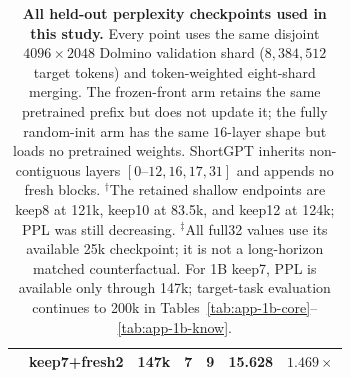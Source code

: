 \begin{table}[t]
{\begin{tabular}{@{}llrrrrr@{}}
& keep7+fresh2 & 147k & 7 & 9 & 15.628 & $1.469\times$ \\
\bottomrule
\end{tabular}%
}
\caption{\textbf{All held-out perplexity checkpoints used in this study.}
Every point uses the same disjoint $4096\times2048$ Dolmino validation shard
($8{,}384{,}512$ target tokens) and token-weighted eight-shard merging. The
frozen-front arm retains the same pretrained prefix but does not update it; the
fully random-init arm has the same $16$-layer shape but loads no pretrained
weights. ShortGPT inherits non-contiguous layers $[0\text{--}12,16,17,31]$
and appends no fresh blocks. $^{\dagger}$The retained shallow endpoints are keep8 at 121k, keep10 at 83.5k, and keep12 at 124k; PPL was still decreasing.
$^{\ddagger}$All full32 values use its available 25k checkpoint; it is not a long-horizon matched counterfactual.
For 1B keep7, PPL is available only through 147k; target-task evaluation
continues to 200k in Tables~\ref{tab:app-1b-core}--\ref{tab:app-1b-know}.}
\label{tab:app-ppl}
\end{table}
